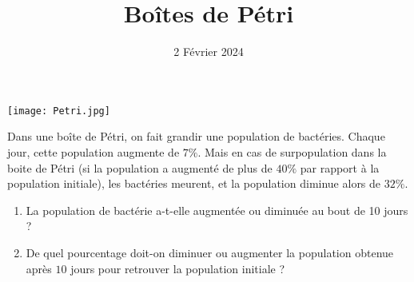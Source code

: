 \documentclass{article}
\title{Boîtes de Pétri}
\author{}
\date{2 Février 2024}
\begin{document}
\maketitle
\begin{center}
\texttt{[image: Petri.jpg]}
\end{center}
Dans une boîte de Pétri, on fait grandir une population de bactéries. Chaque jour, cette population augmente de $7\%$. Mais en cas de surpopulation dans la boite de Pétri (si la population a augmenté de plus de $40\%$ par rapport à la population initiale), les bactéries meurent, et la population diminue alors de $32\%$. 
\begin{enumerate}
\item La population de bactérie a-t-elle augmentée ou diminuée au bout de 10 jours ?
\item De quel pourcentage doit-on diminuer ou augmenter la population obtenue après $10$ jours pour retrouver la population initiale ?
\end{enumerate}
\end{document}
